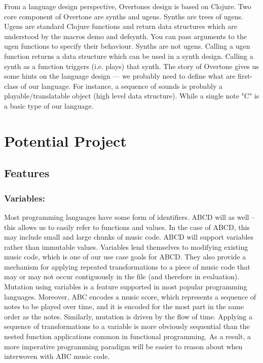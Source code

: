 From a language design perspective, Overtones design is based on Clojure. Two core component of Overtone are synths and ugens. Synths are trees of ugens. Ugens are standard Clojure functions and return data structures which are understood by the macros demo and defsynth. You can pass arguments to the ugen functions to specify their behaviour. Synths are not ugens. Calling a ugen function returns a data structure which can be used in a synth design. Calling a synth as a function triggers (i.e. plays) that synth.\cite{Aaron14} The story of Overtone gives us some hints on the language design --- we probably need to define what are first-class of our language. For instance, a sequence of sounds is probably a playable/translatable object (high level data structure). While a single note "C" is a basic type of our language.

\section{Potential Project}

\subsection{Features}
	\subsubsection{Variables:}
	Most programming languages have some form of identifiers. ABCD will as well -- this allows us to easily refer to functions and values. In the case of ABCD, this may include small and large chunks of music code. ABCD will support variables rather than immutable values. Variables lend themselves to modifying existing music code, which is one of our use case goals for ABCD. They also provide a mechanism for applying repeated transformations to a piece of music code that may or may not occur contiguously in the file (and therefore in evaluation). Mutation using variables is a feature supported in most popular programming languages. Moreover, ABC encodes a music score, which represents a sequence of notes to be played over time, and it is encoded for the most part in the same order as the notes. Similarly, mutation is driven by the flow of time. Applying a sequence of transformations to a variable is more obviously sequential than the nested function applications common in functional programming. As a result, a more imperative programming paradigm will be easier to reason about when interwoven with ABC music code.

